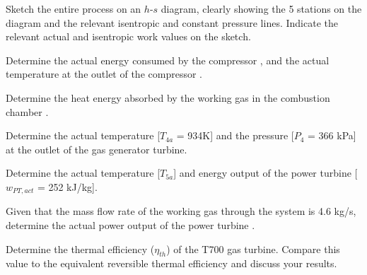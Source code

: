 \begin{homework}
  \begin{questionparts}
  \item Sketch the entire process on an $h$-$s$ diagram, clearly showing the 5 stations on the diagram and the relevant isentropic and constant pressure lines. Indicate the relevant actual and isentropic work values on the sketch.
  \item Determine the actual energy consumed by the compressor \answer{[$w_{C,act}$ = 373 kJ/kg]}, and the actual temperature at the outlet of the compressor \answer{[$T_{2a}$ = 628K]}.
  \item Determine the heat energy absorbed by the working gas in the combustion chamber \answer{[$q_H$ = 709 kJ/kg]}.
  \item Determine the actual temperature [$T_{4a}$ = 934K] and the pressure [$P_4$ = 366 kPa] at the outlet of the gas generator turbine.
  \item Determine the actual temperature [$T_{5a}$] and energy output of the power turbine [$w_{PT,act}$ = 252 kJ/kg].
  \item Given that the mass flow rate of the working gas through the system is 4.6 kg/s, determine the actual power output of the power turbine \answer{[1161 kW]}.
  \item Determine the thermal efficiency ($\eta_{th}$) of the T700 gas turbine. Compare this value to the equivalent reversible thermal efficiency and discuss your results.
  \end{questionparts}

\end{homework}

